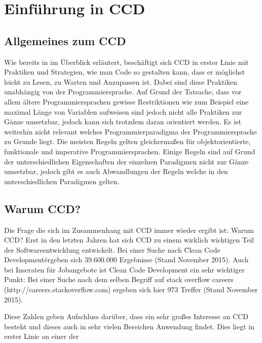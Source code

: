 \chapter{Einführung in CCD}
\label{cha:Diplomschrift}

\section{Allgemeines zum CCD}
Wie bereits in im Überblick erläutert, beschäftigt sich CCD in erster Linie mit Praktiken und Strategien, wie man Code so gestalten kann, dass er möglichst leicht zu Lesen, zu Warten und Anzupassen ist. Dabei sind diese Praktiken unabhängig von der Programmiersprache. Auf Grund der Tatsache, dass vor allem ältere Programmiersprachen gewisse Restriktionen wie zum Beispiel eine maximal Länge von Variablen aufweisen sind jedoch nicht alle Praktiken zur Gänze umsetzbar, jedoch kann sich trotzdem daran orientiert werden. Es ist weiterhin nicht relevant welches Programmierparadigma der Programmiersprache zu Grunde liegt. Die meisten Regeln gelten gleichermaßen für objektorientierte, funktionale und imperative Programmiersprachen. Einige Regeln sind auf Grund der unterschiedlichen Eigenschaften der einzelnen Paradigmen nicht zur Gänze umsetzbar, jedoch gibt es auch Abwandlungen der Regeln welche in den unterschiedlichen Paradigmen gelten. 

\section{Warum CCD?}
Die Frage die sich im Zusammenhang mit CCD immer wieder ergibt ist: Warum CCD? Erst in den letzten Jahren hat sich CCD zu einem wirklich wichtigen Teil der Softwareentwicklung entwickelt. Bei einer Suche nach \"Clean Code Development\" ergeben sich 39.600.000 Ergebnisse (Stand November 2015). Auch bei Inseraten für Jobangebote ist Clean Code Development ein sehr wichtiger Punkt: Bei einer Suche nach dem selben Begriff auf stack overflow careers (http://careers.stackoverflow.com) ergeben sich hier 973 Treffer (Stand November 2015).

\SuperPar Diese Zahlen geben Aufschluss darüber, dass ein sehr großes Interesse an CCD besteht und dieses auch in sehr vielen Bereichen Anwendung findet. Dies liegt in erster Linie an einer der 
